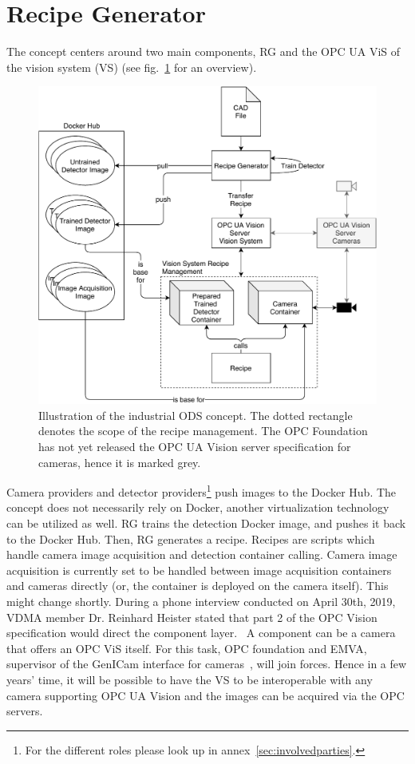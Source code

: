 \section{Recipe Generator}
The concept centers around two main components, RG and the OPC UA ViS of the vision system (VS) (see fig.~\ref{fig:concept} for an overview).
\begin{figure}
    \centering
    \includegraphics[width=\textwidth]{img/Concept.pdf}
    \caption[Concept]{Illustration of the industrial ODS concept. The dotted rectangle denotes the scope of the recipe management. The OPC Foundation has not yet released the OPC UA Vision server specification for cameras, hence it is marked grey.}
    \label{fig:concept}
\end{figure}

Camera providers and detector providers\footnote{For the different roles please look up in annex~\ref{sec:involvedparties}.} push images to the Docker Hub.  The concept does not necessarily rely on Docker, another virtualization technology can be utilized as well. RG trains the detection Docker image, and pushes it back to the Docker Hub. Then, RG generates a recipe. Recipes are scripts which handle camera image acquisition and detection container calling. Camera image acquisition is currently set to be handled between image acquisition containers and cameras directly (or, the container is deployed on the camera itself). This might change shortly. During a phone interview conducted on April 30th, 2019, VDMA member Dr. Reinhard Heister stated that part 2 of the OPC Vision specification would direct the component layer.~\cite{Heister2019TheInterview} A component can be a camera that offers an OPC ViS itself. For this task, OPC foundation and EMVA, supervisor of the GenICam interface for cameras~\cite{EMVA2019GenICam2019}, will join forces. Hence in a few years' time, it will be possible to have the VS to be interoperable with any camera supporting OPC UA Vision and the images can be acquired via the OPC servers.

